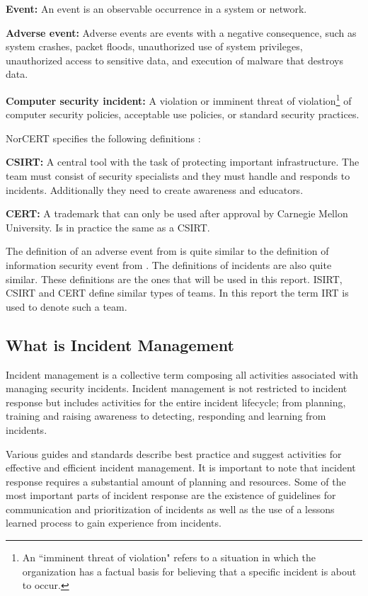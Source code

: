 \textbf{Event:} An event is an observable occurrence in a system or network.

\textbf{Adverse event:} Adverse events are events with a negative consequence, such as system crashes, packet floods, unauthorized use of system privileges, unauthorized access to sensitive data, and execution of malware that destroys data.

\textbf{Computer security incident:} A violation or imminent threat of violation\footnote{An ``imminent threat of violation" refers to a situation in which the organization has a factual basis for believing that a specific incident is about to occur.} of computer security policies, acceptable use policies, or standard security practices.

\acs{NorCERT} specifies the following definitions \cite{NorCERT3Kvartal2012}:

\textbf{\ac{CSIRT}:} A central tool with the task of protecting important infrastructure. The team must consist of security specialists and they must handle and responds to incidents. Additionally they need to create awareness and educators.

\textbf{\ac{CERT}:} A trademark that can only be used after approval by Carnegie Mellon University. Is in practice the same as a \acs{CSIRT}.

The definition of an adverse event from \cite{nist800-61} is quite similar to the definition of information security event from \cite{ISO/IEC27000}. The definitions of incidents are also quite similar. These definitions are the ones that will be used in this report. \ac{ISIRT}, \ac{CSIRT} and \ac{CERT} define similar types of teams. In this report the term \acs{IRT} is used to denote such a team. 

\subsection{What is Incident Management}
Incident management is a collective term composing all activities associated with managing security incidents. Incident management is not restricted to incident response but includes activities for the entire incident lifecycle; from planning, training and raising awareness to detecting, responding and learning from incidents. 

Various guides and standards describe best practice and suggest activities for effective and efficient incident management. It is important to note that incident response requires a substantial amount of planning and resources. Some of the most important parts of incident response are the existence of guidelines for communication and prioritization of incidents as well as the use of a lessons learned process to gain experience from incidents. \cite{nist800-61}

